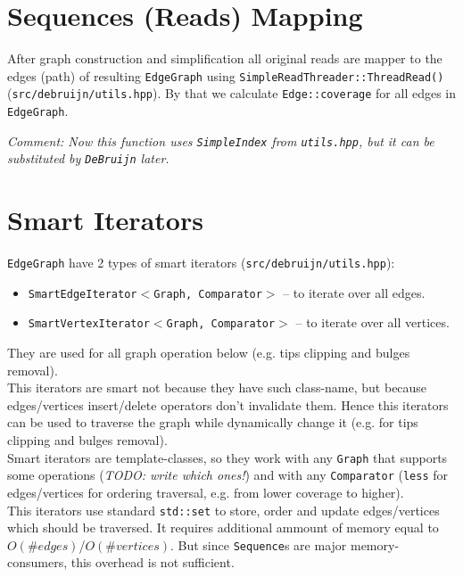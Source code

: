 \documentclass[14pt]{article}
\begin{document}
\section{Sequences (Reads) Mapping}

After graph construction and simplification all original reads are mapper to the edges (path) of resulting \texttt{EdgeGraph} using \texttt{SimpleReadThreader::ThreadRead()} (\texttt{src/debruijn/utils.hpp}). By that we calculate \texttt{Edge::coverage} for all edges in \texttt{EdgeGraph}.

\textit{Comment: Now this function uses \texttt{SimpleIndex} from \texttt{utils.hpp}, but it can be substituted by \texttt{DeBruijn} later.} 

\section{Smart Iterators}

\texttt{EdgeGraph} have 2 types of smart iterators (\texttt{src/debruijn/utils.hpp}):
\begin{itemize}
\item \texttt{SmartEdgeIterator$<$Graph, Comparator$>$} -- to iterate over all edges.
\item \texttt{SmartVertexIterator$<$Graph, Comparator$>$} -- to iterate over all vertices.
\end{itemize}
They are used for all graph operation below (e.g. tips clipping and bulges removal). \\

This iterators are smart not because they have such class-name, but because edges/vertices insert/delete operators don't invalidate them. Hence this iterators can be used to traverse the graph while dynamically change it (e.g. for tips clipping and bulges removal). \\

Smart iterators are template-classes, so they work with any \texttt{Graph} that supports some operations (\textit{TODO: write which ones!}) and with any \texttt{Comparator} (\texttt{less} for edges/vertices for ordering traversal, e.g. from lower coverage to higher). \\

This iterators use standard \texttt{std::set} to store, order and update edges/vertices which should be traversed. It requires additional ammount of memory equal to $O(\#edges)$/$O(\#vertices)$. But since \texttt{Sequence}s are major memory-consumers, this overhead is not sufficient.
\end{document}

